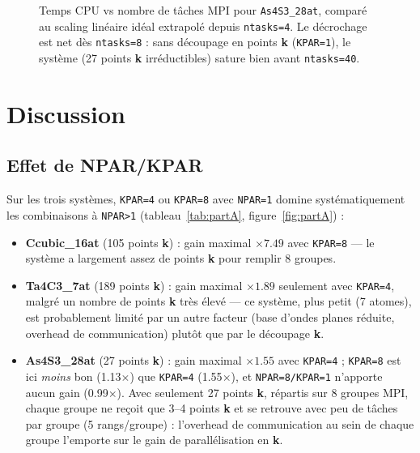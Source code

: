 \documentclass[11pt,a4paper]{article}
\begin{document}
\begin{figure}[h]
\centering
{}
\caption{Temps CPU vs nombre de tâches MPI pour \texttt{As4S3\_28at}, comparé au scaling linéaire
idéal extrapolé depuis \texttt{ntasks=4}. Le décrochage est net dès \texttt{ntasks=8} : sans
découpage en points \textbf{k} (\texttt{KPAR=1}), le système (27 points \textbf{k} irréductibles)
sature bien avant \texttt{ntasks=40}.}
\label{fig:partB}
\end{figure}

\section{Discussion}

\subsection{Effet de NPAR/KPAR}

Sur les trois systèmes, \texttt{KPAR=4} ou \texttt{KPAR=8} avec \texttt{NPAR=1} domine
systématiquement les combinaisons à \texttt{NPAR>1} (tableau~\ref{tab:partA}, figure~\ref{fig:partA}) :

\begin{itemize}
  \item \textbf{Ccubic\_16at} (105 points \textbf{k}) : gain maximal $\times7.49$ avec
  \texttt{KPAR=8} — le système a largement assez de points \textbf{k} pour remplir 8 groupes.
  \item \textbf{Ta4C3\_7at} (189 points \textbf{k}) : gain maximal $\times1.89$ seulement avec
  \texttt{KPAR=4}, malgré un nombre de points \textbf{k} très élevé — ce système, plus petit
  (7 atomes), est probablement limité par un autre facteur (base d'ondes planes réduite, overhead
  de communication) plutôt que par le découpage \textbf{k}.
  \item \textbf{As4S3\_28at} (27 points \textbf{k}) : gain maximal $\times1.55$ avec
  \texttt{KPAR=4} ; \texttt{KPAR=8} est ici \emph{moins} bon (1.13$\times$) que \texttt{KPAR=4}
  (1.55$\times$), et \texttt{NPAR=8/KPAR=1} n'apporte aucun gain (0.99$\times$). Avec seulement
  27 points \textbf{k}, répartis sur 8 groupes MPI, chaque groupe ne reçoit que 3--4 points
  \textbf{k} et se retrouve avec peu de tâches par groupe (5 rangs/groupe) : l'overhead de
  communication au sein de chaque groupe l'emporte sur le gain de parallélisation en \textbf{k}.
\end{itemize}
\end{document}
